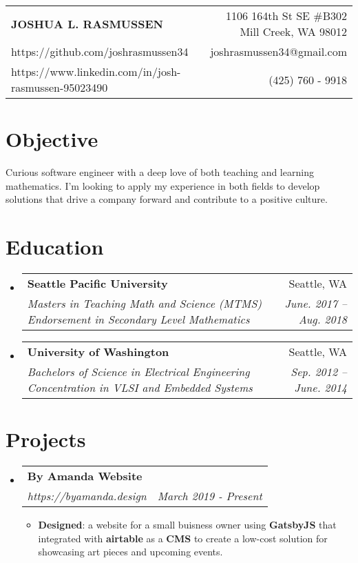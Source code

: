 \documentclass[letterpaper,11pt]{article}
\makeatletter
\newcommand{\CVName}{JOSHUA L. RASMUSSEN}
\newcommand{\CVAddress}{ 1106 164th St SE \#B302 Mill Creek, WA 98012 }
\newcommand{\CVPhone}{(425) 760 - 9918}
\newcommand{\CVEmail}{joshrasmussen34@gmail.com}
\newcommand{\CVGithub}{https://github.com/joshrasmussen34}
\newcommand{\CVLinkedin}{https://www.linkedin.com/in/josh-rasmussen-95023490}
\newcommand{\resumeItem}[2]{
  \item\small{
    \textbf{#1}{: #2 \vspace{-2pt}}
  }
}
\newcommand{\resumeSubheading}[4]{
  \vspace{4pt}\item
    \begin{tabular*}{0.97\textwidth}{p{0.7\textwidth} @{\extracolsep{\fill}} r}
      \textbf{#1} & #2 \\
      \raggedright{\textit{\small#3}} & \textit{\small #4} \\
    \end{tabular*}\vspace{-4pt}
}
\newcommand{\resumeSubHeadingListStart}{\begin{itemize}[leftmargin=*]}
\newcommand{\resumeSubHeadingListEnd}{\end{itemize}}
\newcommand{\resumeItemListStart}{\begin{itemize}}
\newcommand{\resumeItemListEnd}{\end{itemize}\vspace{-5pt}}
\makeatother
\begin{document}
\begin{tabular*}{\textwidth}{l@{\extracolsep{\fill}}r}
  \textbf{\large\bf\CVName} & \CVAddress \\
   \CVGithub & \CVEmail \\
   \CVLinkedin & \CVPhone \\ 
\end{tabular*}

\section{Objective}{Curious software engineer with a deep love of both teaching and learning mathematics. I'm looking to apply my experience in both fields to develop solutions that drive a company forward and contribute to a positive culture.}

\section{Education}
  \resumeSubHeadingListStart
    \resumeSubheading
    {Seattle Pacific University}{Seattle, WA}
    {Masters in Teaching Math and Science (MTMS) \newline Endorsement in Secondary Level Mathematics}{June. 2017 -- Aug. 2018}
    \resumeSubheading
    {University of Washington}{Seattle, WA}
    {Bachelors of Science in Electrical Engineering \newline Concentration in VLSI and Embedded Systems}{Sep. 2012 -- June. 2014}
  \resumeSubHeadingListEnd


\section{Projects}
  \resumeSubHeadingListStart
    \resumeSubheading
      {By Amanda Website}{}
      {https://byamanda.design}{March 2019 - Present}
      \resumeItemListStart 
        \resumeItem{Designed}{a website for a small buisness owner using \textbf{GatsbyJS} that integrated with \textbf{airtable} as a \textbf{CMS} to create a low-cost solution for showcasing art pieces and upcoming events.}
      \resumeItemListEnd
  \resumeSubHeadingListEnd


\end{document}
